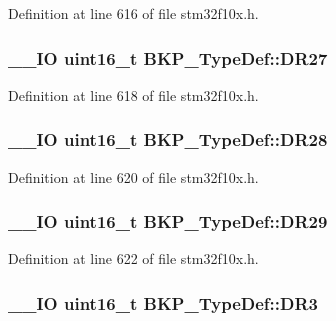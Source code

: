 Definition at line 616 of file stm32f10x.\-h.

\hypertarget{struct_b_k_p___type_def_ad5e851ff7c4e78c3ec10bedf4cbec918}{
\subsubsection[{D\-R27}]{\setlength{\rightskip}{0pt plus 5cm}\-\_\-\-\_\-\-I\-O {\bf uint16\-\_\-t} B\-K\-P\-\_\-\-Type\-Def\-::\-D\-R27}}\label{struct_b_k_p___type_def_ad5e851ff7c4e78c3ec10bedf4cbec918}


Definition at line 618 of file stm32f10x.\-h.

\hypertarget{struct_b_k_p___type_def_a741b11fc49b1b78afeb0585844b1f12d}{
\subsubsection[{D\-R28}]{\setlength{\rightskip}{0pt plus 5cm}\-\_\-\-\_\-\-I\-O {\bf uint16\-\_\-t} B\-K\-P\-\_\-\-Type\-Def\-::\-D\-R28}}\label{struct_b_k_p___type_def_a741b11fc49b1b78afeb0585844b1f12d}


Definition at line 620 of file stm32f10x.\-h.

\hypertarget{struct_b_k_p___type_def_a39b3d425209555dfe74c0b51c565115d}{
\subsubsection[{D\-R29}]{\setlength{\rightskip}{0pt plus 5cm}\-\_\-\-\_\-\-I\-O {\bf uint16\-\_\-t} B\-K\-P\-\_\-\-Type\-Def\-::\-D\-R29}}\label{struct_b_k_p___type_def_a39b3d425209555dfe74c0b51c565115d}


Definition at line 622 of file stm32f10x.\-h.

\hypertarget{struct_b_k_p___type_def_a034cf532a9752513de879c0f4ff38d0a}{
\subsubsection[{D\-R3}]{\setlength{\rightskip}{0pt plus 5cm}\-\_\-\-\_\-\-I\-O {\bf uint16\-\_\-t} B\-K\-P\-\_\-\-Type\-Def\-::\-D\-R3}}\label{struct_b_k_p___type_def_a034cf532a9752513de879c0f4ff38d0a}


